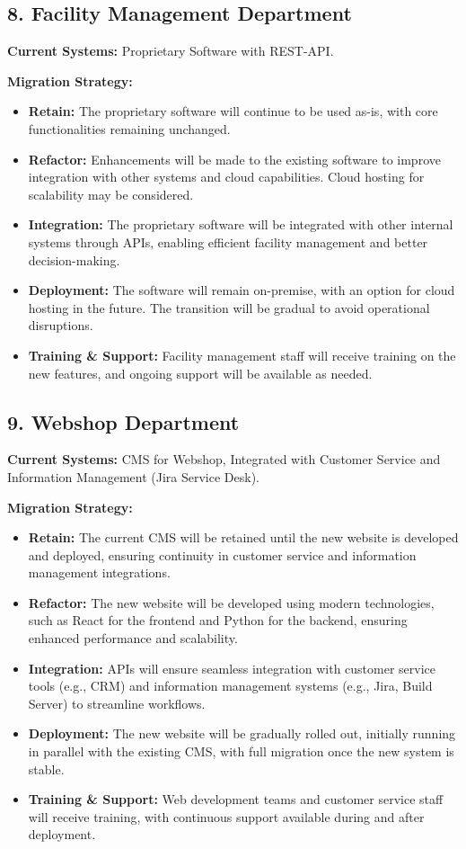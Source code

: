 \subsection{8. Facility Management Department} 
\textbf{Current Systems:} Proprietary Software with REST-API.

\textbf{Migration Strategy:}
\begin{itemize}
    \item \textbf{Retain:} The proprietary software will continue to be used as-is, with core functionalities remaining unchanged.
    \item \textbf{Refactor:} Enhancements will be made to the existing software to improve integration with other systems and cloud capabilities. Cloud hosting for scalability may be considered.
    \item \textbf{Integration:} The proprietary software will be integrated with other internal systems through APIs, enabling efficient facility management and better decision-making.
    \item \textbf{Deployment:} The software will remain on-premise, with an option for cloud hosting in the future. The transition will be gradual to avoid operational disruptions.
    \item \textbf{Training \& Support:} Facility management staff will receive training on the new features, and ongoing support will be available as needed.
\end{itemize}

\subsection{9. Webshop Department} 
\textbf{Current Systems:} CMS for Webshop, Integrated with Customer Service and Information Management (Jira Service Desk).

\textbf{Migration Strategy:}
\begin{itemize}
    \item \textbf{Retain:} The current CMS will be retained until the new website is developed and deployed, ensuring continuity in customer service and information management integrations.
    \item \textbf{Refactor:} The new website will be developed using modern technologies, such as React for the frontend and Python for the backend, ensuring enhanced performance and scalability.
    \item \textbf{Integration:} APIs will ensure seamless integration with customer service tools (e.g., CRM) and information management systems (e.g., Jira, Build Server) to streamline workflows.
    \item \textbf{Deployment:} The new website will be gradually rolled out, initially running in parallel with the existing CMS, with full migration once the new system is stable.
    \item \textbf{Training \& Support:} Web development teams and customer service staff will receive training, with continuous support available during and after deployment.
\end{itemize}


